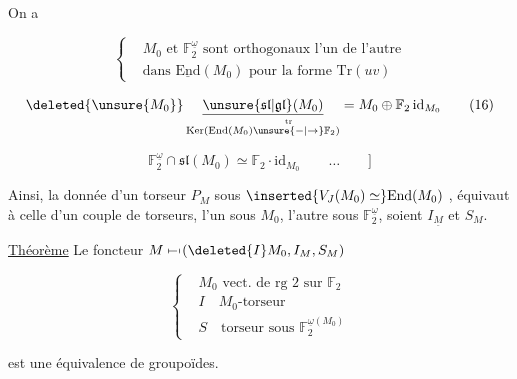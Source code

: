 On a

\[
\left\{\begin{aligned}
&M_0\text{ et }\mathbb F_2^{\underline\omega}\text{ sont orthogonaux l'un de l'autre}\\
&\text{dans }\underline{\mathrm{End}}(M_0)\text{ pour la forme }\mathrm{Tr}(uv)
\end{aligned}\right. \tag*{(15)}
\]

\[
\deleted{\unsure{M_0}}\,
\underset{\mathrm{Ker}(\mathrm{End}(M_0)\overset{\mathrm{tr}}{\unsure{\relbar|\to}}\mathbb F_2)}
{\underline{\unsure{\mathfrak{sl}|\mathfrak{gl}}(M_0)}}
=M_0\oplus\mathbb F_2\,\mathrm{id}_{M_0} \tag*{(16)}
\]

\[
\mathbb F_2^{\underline\omega}\cap\mathfrak{sl}(M_0)\simeq
\mathbb F_2\cdot\mathrm{id}_{M_0}\qquad\ldots\qquad\biggr] \tag*{(17)}
\]

Ainsi, la donnée d'un torseur $P_M$ sous $\inserted{V_J(M_0)\simeq}\mathrm{End}(M_0)$ , équivaut à celle d'un couple de torseurs,  l'un sous $M_0$, l'autre sous $\mathbb F_2^{\underline\omega}$, soient $I_{\underline M}$ et $S_M$.

\uline{Théorème} Le foncteur \(\displaystyle M\mathrel{\mapstochar\relbar\mapstochar}(\deleted{I}M_0,I_M,S_M)\)


 

\[
\left\{\begin{aligned}
&M_0\text{ vect. de rg }2\text{ sur }\mathbb F_2\\
&I\quad M_0\text{-torseur}\\
&S\quad\text{torseur sous }\mathbb F_2^{\underline\omega(M_0)}
\end{aligned}\right.
\]

est une équivalence de groupoïdes.

